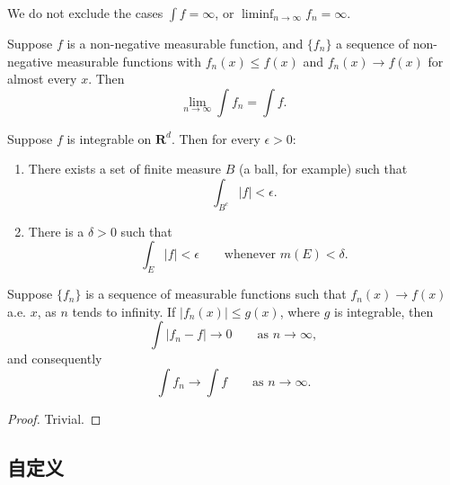 \begin{remark}
	We do not exclude the cases $\int f = \infty$,
	or $\liminf_{n \to \infty} f_n = \infty$.
\end{remark}

\begin{corollary}
	Suppose $f$ is a non-negative measurable function, and $\{f_n\}$ a sequence
	of non-negative measurable functions with
	$f_n(x) \leq f(x)$ and $f_n(x) \to f(x)$ for almost every $x$. Then
	\begin{equation}
	\lim_{n \to \infty} \int f_n = \int f.
	\end{equation}
\end{corollary}

\begin{proposition}
	Suppose $f$ is integrable on $\mathbf{R}^d$. Then for every $\epsilon > 0$:
	\begin{enumerate}
		\renewcommand{\theenumi}{\roman{enumi}}
		\item There exists a set of finite measure $B$ (a ball, for example) such that
		\begin{equation}
		\int_{B^c} |f| < \epsilon.
		\end{equation}
		\item There is a $\delta > 0$ such that
		\begin{equation}
		\int_E |f| < \epsilon \qquad \text{whenever } m(E) < \delta.
		\end{equation}
	\end{enumerate}
\end{proposition}

\begin{theorem}
	Suppose $\{f_n\}$ is a sequence of measurable functions such that
	$f_n(x) \to f(x)$ a.e. $x$, as $n$ tends to infinity.
	If $|f_n(x)| \leq g(x)$, where $g$ is integrable, then
	\begin{equation}
	\int |f_n - f| \to 0 \qquad \text{as } n \to \infty,
	\end{equation}
	and consequently
	\begin{equation}
	\int f_n \to \int f \qquad \text{as } n \to \infty.
	\end{equation}
\end{theorem}

\begin{proof}
	Trivial.
\end{proof}


\subsection{自定义}

